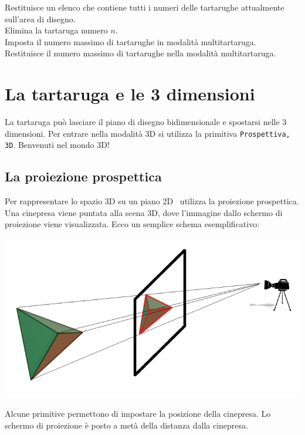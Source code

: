 Restituisce un elenco che contiene tutti i numeri delle tartarughe attualmente sull'area di disegno. \\

Elimina la tartaruga numero $n$.\\

Imposta il numero massimo di tartarughe in modalità multitartaruga.\\

Restituisce il numero massimo di tartarughe nella modalità multitartaruga.




\section{La tartaruga e le 3 dimensioni} \label{3D}
La tartaruga può lasciare il piano di disegno bidimensionale e spostarsi nelle 3 dimensioni. Per entrare nella modalità 3D si utilizza la primitiva \texttt{Prospettiva, 3D}. Benvenuti nel mondo 3D!
\subsection{La proiezione prospettica}
Per rappresentare lo spazio 3D su un piano 2D \xlogo\ utilizza la proiezione prospettica. Una cinepresa viene puntata alla scena 3D, dove l'immagine dallo schermo di proiezione viene visualizzata. Ecco un semplice schema esemplificativo: 
\begin{center}
	\includegraphics*[scale=0.6]{pics/perspective.png}
\end{center}
Alcune primitive permettono di impostare la posizione della cinepresa. Lo schermo di proiezione è posto a metà della distanza dalla cinepresa.

